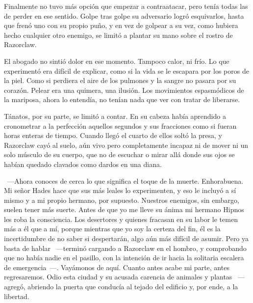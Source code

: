 Finalmente no tuvo más opción que empezar a contraatacar, pero tenía todas las de perder en ese sentido. Golpe tras golpe su adversario logró esquivarlos, hasta que frenó uno con su propio puño, y en vez de golpear a su vez, como hubiera hecho cualquier otro enemigo, se limitó a plantar su mano sobre el rostro de Razorclaw.

El abogado no sintió dolor en ese momento. Tampoco calor, ni frío. Lo que experimentó era difícil de explicar, como si la vida se le escapara por los poros de la piel. Como si perdiera el aire de los pulmones y la sangre no pasara por su corazón. Pelear era una quimera, una ilusión. Los movimientos espasmódicos de la mariposa, ahora lo entendía, no tenían nada que ver con tratar de liberarse.

Tánatos, por su parte, se limitó a contar. En su cabeza había aprendido a cronometrar a la perfección aquellos segundos y sus fracciones como si fueran horas enteras de tiempo. Cuando llegó el cuarto de ellos soltó la presa, y Razorclaw cayó al suelo, aún vivo pero completamente incapaz ni de mover ni un solo músculo de su cuerpo, que no de escuchar o mirar allá donde sus ojos se habían quedado clavados como dardos en una diana.

~---Ahora conoces de cerca lo que significa el toque de la muerte. Enhorabuena. Mi señor Hades hace que sus más leales lo experimenten, y eso le incluyó a sí mismo y a mi propio hermano, por supuesto. Nuestros enemigos, sin embargo, suelen tener más suerte. Antes de que yo me lleve su ánima mi hermano Hipnos les roba la consciencia. Los desertores y quienes fracasan en su labor le temen más a él que a mí, porque mientras que yo soy la certeza del fin, él es la incertidumbre de no saber si despertarán, algo aún más difícil de asumir. Pero ya basta de hablar ~---terminó cargando a Razorclaw en el hombro, y comprobando que no había nadie en el pasillo, con la intención de ir hacia la solitaria escalera de emergencia~---. Vayámonos de aquí. Cuanto antes acabe mi parte, antes regresaremos. Odio esta ciudad y su acusada carencia de animales y plantas ~---agregó, abriendo la puerta que conducía al tejado del edificio y, por ende, a la libertad.

\endinput
